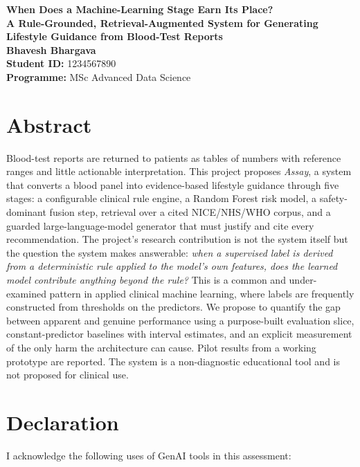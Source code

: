 \documentclass[11pt,a4paper]{article}
\begin{document}
\singlespacing
\thispagestyle{empty}

\begin{center}
{\bf \LARGE When Does a Machine-Learning Stage Earn Its Place?}\\[0.2cm]
{\bf \large A Rule-Grounded, Retrieval-Augmented System for Generating\\
Lifestyle Guidance from Blood-Test Reports}\\[0.6cm]
    \textbf{Bhavesh Bhargava} \\[0.2cm]
    \textbf{Student ID:} 1234567890 \\[0.2cm]
    \textbf{Programme:} MSc Advanced Data Science \\[1cm]
\end{center}

\section*{Abstract}

\noindent
Blood-test reports are returned to patients as tables of numbers with reference
ranges and little actionable interpretation. This project proposes \emph{Assay}, a
system that converts a blood panel into evidence-based lifestyle guidance through
five stages: a configurable clinical rule engine, a Random Forest risk model, a
safety-dominant fusion step, retrieval over a cited NICE/NHS/WHO corpus, and a
guarded large-language-model generator that must justify and cite every
recommendation. The project's research contribution is not the system itself but
the question the system makes answerable: \emph{when a supervised label is derived
from a deterministic rule applied to the model's own features, does the learned
model contribute anything beyond the rule?} This is a common and under-examined
pattern in applied clinical machine learning, where labels are frequently
constructed from thresholds on the predictors. We propose to quantify the gap
between apparent and genuine performance using a purpose-built evaluation slice,
constant-predictor baselines with interval estimates, and an explicit measurement
of the only harm the architecture can cause. Pilot results from a working
prototype are reported. The system is a non-diagnostic educational tool and is not
proposed for clinical use.

\newpage
\thispagestyle{empty}
\section*{Declaration}
I acknowledge the following uses of GenAI tools in this assessment:
\end{document}
